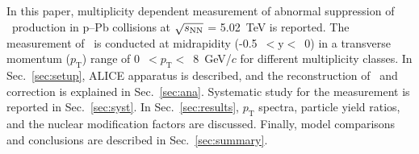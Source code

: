


\DIFaddend 

In this paper, multiplicity dependent measurement of abnormal suppression of \fzero~production in p--Pb collisions at $\sqrt{s_{\rm NN}}$ = 5.02~TeV is reported. The measurement of \fzero~is conducted at midrapidity (-0.5~$<\mathrm{y}<$~0) in a transverse momentum ($p_{\mathrm{T}}$) range of 0~$<p_{\mathrm{T}}<$~8~GeV/$c$ for different multiplicity classes. In Sec.~\ref{sec:setup}, ALICE apparatus is described, and the reconstruction of \fzero~and correction is explained in Sec.~\ref{sec:ana}. Systematic study for the measurement is reported in Sec.~\ref{sec:syst}. In Sec.~\ref{sec:results}, $p_{\mathrm{T}}$ spectra, particle yield ratios, and the nuclear modification factors are discussed. Finally, model comparisons and conclusions are described in Sec.~\ref{sec:summary}.

\label{sec:intro}



